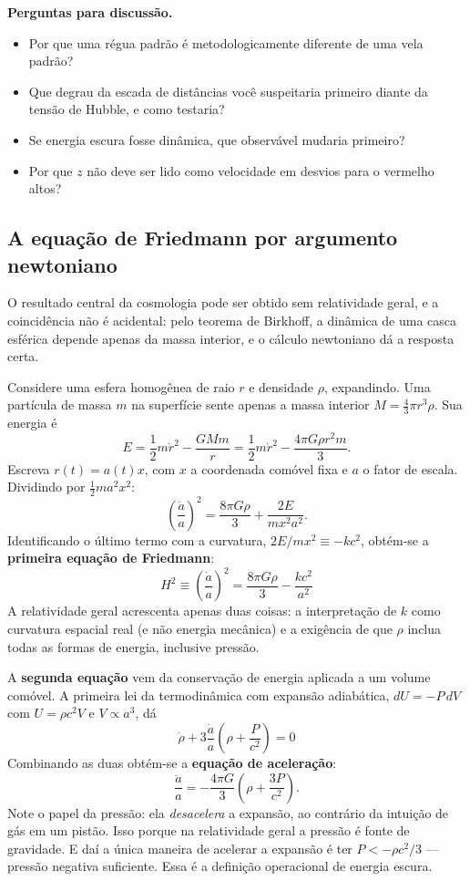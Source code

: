 \documentclass[11pt,a4paper]{article}
\begin{document}
\textbf{Perguntas para discussão.}
\begin{itemize}
\item Por que uma régua padrão é metodologicamente diferente de uma vela padrão?
\item Que degrau da escada de distâncias você suspeitaria primeiro diante da tensão de Hubble, e como testaria?
\item Se energia escura fosse dinâmica, que observável mudaria primeiro?
\item Por que $z$ não deve ser lido como velocidade em desvios para o vermelho altos?
\end{itemize}

\subsection*{A equação de Friedmann por argumento newtoniano}

O resultado central da cosmologia pode ser obtido sem relatividade geral, e a coincidência não é acidental: pelo teorema de Birkhoff, a dinâmica de uma casca esférica depende apenas da massa interior, e o cálculo newtoniano dá a resposta certa.

Considere uma esfera homogênea de raio $r$ e densidade $\rho$, expandindo. Uma partícula de massa $m$ na superfície sente apenas a massa interior $M=\frac{4}{3}\pi r^{3}\rho$. Sua energia é
\[
E=\frac{1}{2}m\dot{r}^{2}-\frac{GMm}{r}
=\frac{1}{2}m\dot{r}^{2}-\frac{4\pi G\rho r^{2}m}{3}.
\]
Escreva $r(t)=a(t)x$, com $x$ a coordenada comóvel fixa e $a$ o fator de escala. Dividindo por $\frac{1}{2}ma^{2}x^{2}$:
\[
\left(\frac{\dot{a}}{a}\right)^{2}=\frac{8\pi G\rho}{3}+\frac{2E}{mx^{2}a^{2}}.
\]
Identificando o último termo com a curvatura, $2E/mx^{2}\equiv-kc^{2}$, obtém-se a \textbf{primeira equação de Friedmann}:
\[
\boxed{\ H^{2}\equiv\left(\frac{\dot{a}}{a}\right)^{2}=\frac{8\pi G\rho}{3}-\frac{kc^{2}}{a^{2}}\ }
\]
A relatividade geral acrescenta apenas duas coisas: a interpretação de $k$ como curvatura espacial real (e não energia mecânica) e a exigência de que $\rho$ inclua todas as formas de energia, inclusive pressão.

A \textbf{segunda equação} vem da conservação de energia aplicada a um volume comóvel. A primeira lei da termodinâmica com expansão adiabática, $dU=-P\,dV$ com $U=\rho c^{2}V$ e $V\propto a^{3}$, dá
\[
\boxed{\ \dot{\rho}+3\frac{\dot{a}}{a}\left(\rho+\frac{P}{c^{2}}\right)=0\ }
\]
Combinando as duas obtém-se a \textbf{equação de aceleração}:
\[
\frac{\ddot{a}}{a}=-\frac{4\pi G}{3}\left(\rho+\frac{3P}{c^{2}}\right).
\]
Note o papel da pressão: ela \emph{desacelera} a expansão, ao contrário da intuição de gás em um pistão. Isso porque na relatividade geral a pressão é fonte de gravidade. E daí a única maneira de acelerar a expansão é ter $P<-\rho c^{2}/3$ --- pressão negativa suficiente. Essa é a definição operacional de energia escura.
\end{document}
